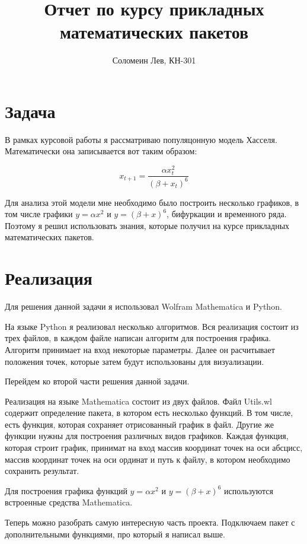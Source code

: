 \documentclass[14pt]{extarticle}
\title{Отчет по курсу прикладных математических пакетов}
\author{Соломеин Лев, КН-301}
\begin{document}
    \maketitle

    \clearpage

    \section*{\centering Задача}

        В рамках курсовой работы я рассматриваю популяцонную модель Хасселя. Математически она записывается вот таким образом:
        
        \[x_{t+1} = \frac{\alpha x_t^2}{(\beta + x_t)^6}\]

        Для анализа этой модели мне необходимо было построить несколько графиков, в том числе графики \(y = \alpha x^2\) и \(y = (\beta + x)^6\), бифуркации и временного ряда. Поэтому я решил использовать знания, которые получил на курсе прикладных математических пакетов.

    \section*{\centering Реализация}

        Для решения данной задачи я использовал Wolfram Mathematica и Python. 
        
        На языке Python я реализовал несколько алгоритмов. Вся реализация состоит из трех файлов, в каждом файле написан алгоритм для построения графика. Алгоритм принимает на вход некоторые параметры. Далее он расчитывает положения точек, которые затем будут использованы для визуализации.

        Перейдем ко второй части решения данной задачи. 

        Реализация на языке Mathematica состоит из двух файлов. Файл Utils.wl содержит определение пакета, в котором есть несколько функций. В том числе, есть функция, которая сохраняет отрисованный график в файл. Другие же функции нужны для построения различных видов графиков. Каждая функция, которая строит график, принимат на вход массив координат точек на оси абсцисс, массив координат точек на оси ординат и путь к файлу, в котором необходимо сохранить результат.

        Для построения графика функций \(y = \alpha x^2\) и \(y = (\beta + x)^6\) используются встроенные средства Mathematica. 
        
        Теперь можно разобрать самую интересную часть проекта. Подключаем пакет с дополнительными функциями, про который я написал выше. 
        
\end{document}
